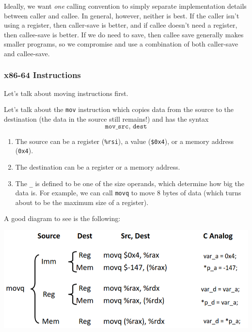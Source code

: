 \documentclass{article}
\begin{document}
      Ideally, we want \textit{one} calling convention to simply separate implementation details between caller and callee. In general, however, neither is best. If the caller isn't using a register, then caller-save is better, and if callee doesn't need a register, then callee-save is better. If we do need to save, then callee save generally makes smaller programs, so we compromise and use a combination of both caller-save and callee-save. 

    \subsubsection{x86-64 Instructions}

      Let's talk about moving instructions first. 

      \begin{definition}[mov]
        Let's talk about the \texttt{mov} instruction which copies data from the source to the destination (the data in the source still remains!) and has the syntax 
        \begin{equation}
          \texttt{mov\_ src, dest}
        \end{equation}
        \begin{enumerate}
          \item The source can be a register (\texttt{\%rsi}), a value (\texttt{\$0x4}), or a memory address (\texttt{0x4}).
          \item The destination can be a register or a memory address. 
          \item The \texttt{\_} is defined to be one of the size operands, which determine how big the data is. For example, we can call \texttt{movq} to move 8 bytes of data (which turns about to be the maximum size of a register). 
        \end{enumerate}
        A good diagram to see is the following: 
        \begin{center}  
          \includegraphics[scale=0.5]{img/movq.png}
        \end{center} 
      \end{definition}
\end{document}
